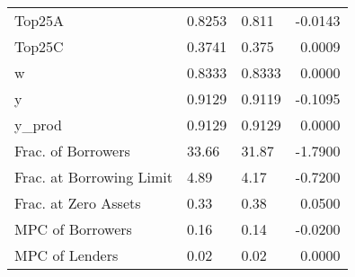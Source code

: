 \begin{table}
\begin{tabular}{lllr}
                  Top25A &  0.8253 &    0.811 & -0.0143 \\
                  Top25C &  0.3741 &    0.375 &  0.0009 \\
                       w &  0.8333 &   0.8333 &  0.0000 \\
                       y &  0.9129 &   0.9119 & -0.1095 \\
                  y\_prod &  0.9129 &   0.9129 &  0.0000 \\
      Frac. of Borrowers &   33.66 &    31.87 & -1.7900 \\
Frac. at Borrowing Limit &    4.89 &     4.17 & -0.7200 \\
    Frac. at Zero Assets &    0.33 &     0.38 &  0.0500 \\
        MPC of Borrowers &    0.16 &     0.14 & -0.0200 \\
          MPC of Lenders &    0.02 &     0.02 &  0.0000 \\
\bottomrule
\end{tabular}
\end{table}
